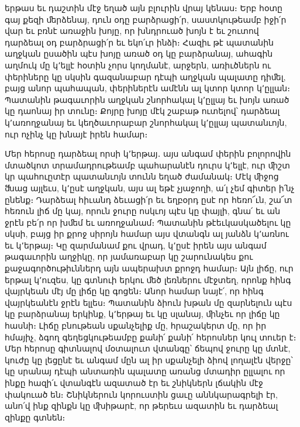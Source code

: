 \documentclass{article}
\begin{document}
{երթաս եւ դաշտին մէջ եղած այն բլուրին վրայ կենաս։ Երբ հօտը գայ քեզի ﬔրձենայ, դուն օդը բարձրացի՛ր, սաստկութեամբ իջի՛ր վար եւ բռնէ առաջին խոյը, որ խնդրուած խոյն է եւ շուտով դարձեալ օդ բարձրացի՛ր եւ եկո՛ւր ինձի։ Հազիւ թէ պատանին աղջկան ըսածին պէս խոյը առած օդ կը բարձրանայ, ահագին աղմուկ մը կ՚ելլէ հօտին չորս կողմանէ, արջերն, առիւծներն ու փերիները կը սկսին գազանաբար դէպի աղջկան պալատը դիﬔլ, բայց անոր պահապան, փերիներէն ամէնն ալ կտոր կտոր կ՚ըլլան։ Պատանին թագաւորին աղջկան շնորհակալ կ՚ըլլայ եւ խոյն առած կը դաոնայ իր տունը։ Քոյրը խոյը մէկ շաբաթ ուտելով՝ դարձեալ կ՚առողջանայ եւ կեղծաւորաբար շնորհակալ կ՚ըլլայ պատանւոյն, ուր ոչինչ կը խնայէ իրեն համար։

Մեր հերոսը դարձեալ որսի կ՚երթայ․ այս անգամ փերին բոլորովին մտածկոտ տրամադրութեամբ պահարանէն դուրս կ՚ելլէ, ուր ﬕշտ կր պահուըտէր պատանւոյն տունն եղած ժամանակ։ Մէկ ﬕջոց ﬓաց այլեւս, կ՚ըսէ աղջկան, այս ալ եթէ չյաջողի, ա՛լ չեմ գիտեր ի՛նչ ընենք։ Դարձեալ հիւանդ ձեւացի՛ր եւ եղբօրդ ըսէ որ հեռո՜ւն, շա՜տ հեռուն լիճ մը կայ, որուն ջուրը ոսկւոյ պէս կը փայլի, գնա՛ եւ ան ջրէն բե՛ր որ խﬔմ եւ առողջանամ։ Պատանին թէեւկասկածելու կը սկսի, բայց իր քրոջ սիրոյն համար այս վտանգն ալ յանձն կ՚առնու եւ կ՚երթայ։ Կը զարմանամ քու վրադ, կ՚ըսէ իրեն այս անգամ թագաւորին աղջիկը, որ յամառաբար կը շարունակես քու քաջագործութիւններդ այն ապերախտ քրոջդ համար։ Այն լիճը, ուր երթալ կ՚ուզես, կը գտնուի երկու ﬔծ լեռներու մէջտեղ, որոնք հինգ վայրկեան մէյ մը լիճը կը գոցեն։ Անոր համար նայէ՛, որ հինգ վայրկեանէն ջրէն ելլես։ Պատանին ձիուն խթան մը զարնելուն պէս կը բարձրանայ երկինք, կ՚երթայ եւ կը սլանայ, ﬕնչեւ որ լիճը կը հասնի։ Լիճը բնութեան սքանչելիք մը, հրաշակերտ մը, որ իր հմայիչ, ձգող գեղեցկութեամբը քանի՛ քանի՛ հերոսներ կուլ տուեր է։ Մեր հերոսը գիտնալով մօտալուտ վտանգը՝ ճեպով ջուրը կը մտնէ, կուժը կը լեցընէ եւ անգամ մըն ալ իր սքանչելի ձիով լողալէն վերջը՝ կը սրանայ դէպի անտառին պալատը առանց մտադիր ըլլալու որ ինքը հազի՛ւ վտանգէն ազատած էր եւ շնիկներն լճակին մէջ փակուած են։ Շնիկներուն կորուստին ցաւը աննկարագրելի էր, անո՛վ ինք զինքն կը ﬗիթարէ, որ թերեւս ազատին եւ դարձեալ զինքը գտնեն։

}
\end{document}

